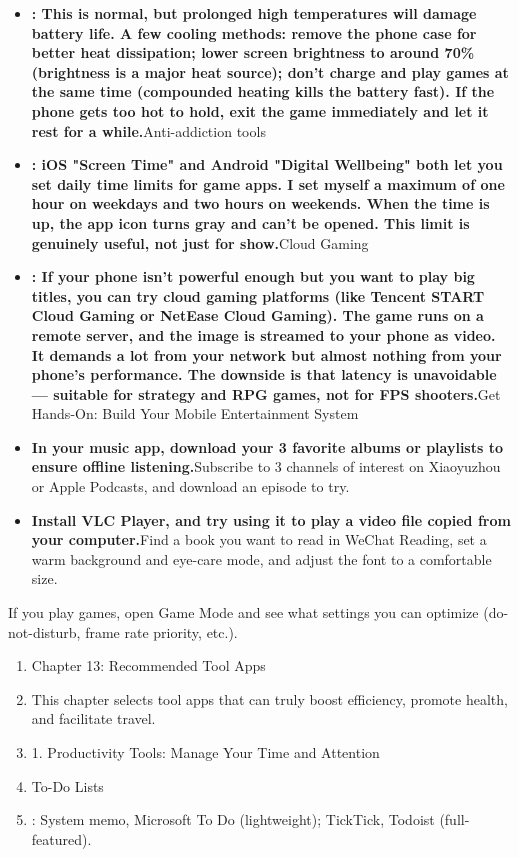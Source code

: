\begin{itemize}
  \item \textbf{: This is normal, but prolonged high temperatures will damage battery life. A few cooling methods: remove the phone case for better heat dissipation; lower screen brightness to around 70\% (brightness is a major heat source); don't charge and play games at the same time (compounded heating kills the battery fast). If the phone gets too hot to hold, exit the game immediately and let it rest for a while.}Anti-addiction tools
  \item \textbf{: iOS "Screen Time" and Android "Digital Wellbeing" both let you set daily time limits for game apps. I set myself a maximum of one hour on weekdays and two hours on weekends. When the time is up, the app icon turns gray and can't be opened. This limit is genuinely useful, not just for show.}Cloud Gaming
  \item \textbf{: If your phone isn't powerful enough but you want to play big titles, you can try cloud gaming platforms (like Tencent START Cloud Gaming or NetEase Cloud Gaming). The game runs on a remote server, and the image is streamed to your phone as video. It demands a lot from your network but almost nothing from your phone's performance. The downside is that latency is unavoidable — suitable for strategy and RPG games, not for FPS shooters.}Get Hands-On: Build Your Mobile Entertainment System
  \item \textbf{In your music app, download your 3 favorite albums or playlists to ensure offline listening.}Subscribe to 3 channels of interest on Xiaoyuzhou or Apple Podcasts, and download an episode to try.
  \item \textbf{Install VLC Player, and try using it to play a video file copied from your computer.}Find a book you want to read in WeChat Reading, set a warm background and eye-care mode, and adjust the font to a comfortable size.
\end{itemize}

\begin{tcbpractice}{If you play games, open Game Mode and see what settings you can optimize (do-not-disturb, frame rate priority, etc.).}
\begin{enumerate}
  \item Chapter 13: Recommended Tool Apps
  \item This chapter selects tool apps that can truly boost efficiency, promote health, and facilitate travel.
  \item 1. Productivity Tools: Manage Your Time and Attention
  \item To-Do Lists
  \item : System memo, Microsoft To Do (lightweight); TickTick, Todoist (full-featured).
\end{enumerate}

\end{tcbpractice}
